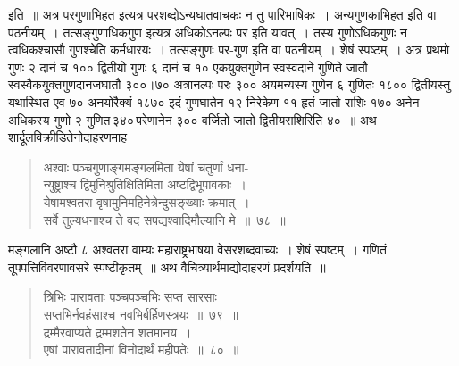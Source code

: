 \documentclass[11pt, openany]{book}
\begin{document}
\noindent इति~॥ अत्र परगुणाभिहत इत्यत्र परशब्दोऽन्यघातवाचकः न तु 
पारिभाषिकः~। अन्यगुणकाभिहत इति वा पठनीयम्~। तत्सङ्गुणाधिकगुण 
इत्यत्र अधिकोऽनल्पः पर इति यावत्~। तस्य गुणोऽधिकगुणः न 
त्वधिकश्चासौ गुणश्चेति कर्मधारयः~। तत्सङ्गुणः पर-गुण इति वा 
पठनीयम्~। शेषं स्पष्टम्~। अत्र प्रथमो गुणः २ दानं च १०० 
द्वितीयो गुणः ६ दानं च १० एकयुक्तगुणेन स्वस्वदाने गुणिते जातौ 
स्वस्वैकयुक्तगुणदानजघातौ ३००।७० अत्रानल्पः परः ३०० अयमन्यस्य 
गुणेन ६ गुणितः १८०० द्वितीयस्तु यथास्थित एव ७० अनयोरैक्यं १८७० 
इदं गुणघातेन १२ निरेकेण ११ हृतं जातो राशिः १७० अनेन अधिकस्य 
गुणो २ गुणित\textendash \,३४०\textendash \,परेणानेन ३०० वर्जितो जातो द्वितीयराशिरिति ४०~॥
\newpage
 अथ शार्दूलविक्रीडितेनोदाहरणमाह\textendash 

 \label{Ex 78}
\begin{quote}
    \ex
     अश्वाः पञ्चगुणाङ्गमङ्गलमिता येषां चतुर्णां धना- \\
 
 \vspace{-7mm}
\hspace{1cm} न्युष्ट्राश्च द्विमुनिश्रुतिक्षितिमिता अष्टद्विभूपावकाः~। \\

\vspace{-7mm}
 येषामश्वतरा वृषामुनिमहिनेत्रेन्दुसङ्ख्याः क्रमात्~। \\

\vspace{-7mm}
\hspace{1cm} सर्वे तुल्यधनाश्च ते वद सपद्यश्वादिमौल्यानि मे~॥~७८~॥~
\end{quote}

मङ्गलानि अष्टौ ८ अश्वतरा वाम्यः महाराष्ट्रभाषया वेसरशब्दवाच्यः~। शेषं स्पष्टम्~। गणितं तूपपत्तिविवरणावसरे स्पष्टीकृतम्~॥ अथ वैचित्र्यार्थमाद्योदाहरणं प्रदर्शयति~॥ 
\begin{quote}
    \ex
     त्रिभिः पारावताः पञ्चपञ्चभिः सप्त सारसाः~। \\
 सप्तभिर्नवहंसाश्च नवभिर्बर्हिणस्त्रयः~॥~७९~॥~\\

\vspace{-5mm}
 द्रम्मैरवाप्यते द्रम्मशतेन शतमानय~। \\
 एषां पारावतादीनां विनोदार्थं महीपतेः~॥~८०~॥~
\end{quote}
\end{document}
